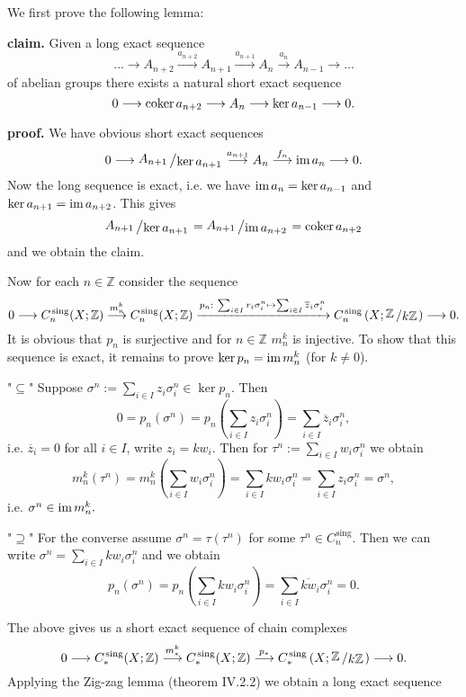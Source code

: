 \documentclass[11pt]{book}
\numberwithin{dummy}{section}
\theoremstyle{nonumberbreak}
\newenvironment{sol}[1][]{\ifthenelse{\equal{#1}{}}{\solution}{\solution[#1]}\rm}{\endsolution}
\newenvironment{prob}[1][]{\ifthenelse{\equal{#1}{}}{\problem}{\problem[#1]}\rm}{\endproblem}
\newcommand{\im}{\mathrm{im} \hspace{1.5pt}}
\newcommand{\cokern}{\mathrm{coker}\hspace{1.5pt}}
\newcommand{\la}{\longrightarrow}
\newcommand{\Z}{\mathbb{Z}}
\newcommand{\Cs}{C^{\hspace{1pt}\mathrm{sing}}}
\newcommand{\slant}[2]{{\raisebox{.1em}{$#1$}\left/\raisebox{-.1em}{$#2$}\right.}}
\begin{document}
\begin{spacing}{1.4}
\begin{prob}
\begin{sol}
\begin{compactenum}
\item We first prove the following lemma:
\begin{compactenum}
\item[\textbf{claim.}] Given a long exact sequence
$$\ldots \la A_{n+2} \overset{a_{n+2}}{\la} A_{n+1} \overset{a_{n+1}}{\la} A_n \overset{a_{n}}{\la} A_{n-1} \la \ldots$$
of abelian groups there exists a natural short exact sequence
$$0 \la \cokern a_{n+2} \la A_n \la \ker a_{n-1} \la 0.$$
\item[\textbf{proof.}] We have obvious short exact sequences
$$0 \la \slant{A_{n+1}}{\ker a_{n+1}} \overset{a_{n+1}}{\la} A_n \overset{f_n}{\la} \im a_n \la 0.$$
Now the long sequence is exact, i.e. we have $\im a_n = \ker a_{n-1}$ and $\ker a_{n+1} = \im a_{n+2}$. This gives
$$\slant{A_{n+1}}{\ker a_{n+1}} = \slant{A_{n+1}}{\im a_{n+2}} = \cokern a_{n+2}$$
and we obtain the claim.
\end{compactenum}
Now for each $n \in \Z$ consider the sequence
$$0 \la \Cs_n(X;\Z) \overset{m^k_n}{\la} \Cs_n(X;\Z) \xrightarrow{p_n: \ \sum_{i\in I}r_i \sigma_i^n \mapsto \sum_{i \in I} \overline{z}_i\sigma_i^n} \Cs_n\left(X; \slant{\Z}{k\Z}\right) \la 0.$$
It is obvious that $p_n$ is surjective and for $n \in \Z$ $m^k_n$ is injective. To show that this sequence is exact, it remains to prove $\ker p_n = \im m^k_n$ (for $k \neq 0$).
\begin{compactenum}
\item["$\subseteq$"] Suppose $\sigma^n := \sum_{i \in I} z_i \sigma_i^n \in \ker p_n$. Then 
$$0= p_n \left( \sigma^n\right) = p_n \left( \sum_{i \in I} z_i \sigma_i^n\right) =  \sum_{ i \in I} \overline{z}_i \sigma_i^n,$$
i.e. $\overline{z}_i=0$ for all $i \in I$, write $z_i = k w_i$. Then for $\tau^n := \sum_{i\in I} w_i\sigma_i^n$ we obtain 
$$m_n^k (\tau^n) = m_n^k \left( \sum_{i \in I} w_i \sigma_i^n\right) = \sum_{i \in I} kw_i \sigma_i^n = \sum_{i \in I} z_i \sigma_i^n = \sigma^n,$$
i.e. $\sigma^n \in \im m^k_n.$
\item["$\supseteq$"] For the converse assume $\sigma^n = \tau(\tau^n)$ for some $\tau^n \in \Cs_n$. Then we can write $\sigma^n=\sum_{i \in I} k w_i \sigma_i^n$ and we obtain 
$$p_n(\sigma^n) = p_n \left( \sum_{i \in I} kw_i \sigma_i^n\right) = \sum_{i \in I} \overline{kw}_i \sigma_i^n = 0.$$
\end{compactenum}
The above gives us a short exact sequence of chain complexes
$$0 \la \Cs_*(X;\Z) \overset{m^k_*}{\la} \Cs_*(X;\Z) \overset{p_*}{\la} \Cs_*\left(X;\slant{\Z}{k\Z}\right) \la 0.$$
Applying the Zig-zag lemma (theorem IV.2.2) we obtain a long exact sequence

\end{compactenum}
\end{sol}
\end{prob}
\end{spacing}
\end{document}
